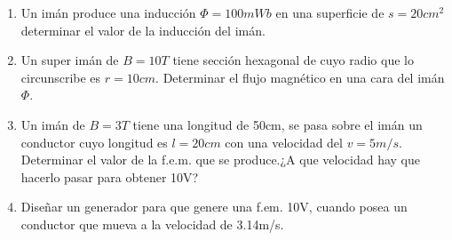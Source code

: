 \documentclass[../main]{subfiles}
\begin{document}
\begin{enumerate}
    \item Un imán produce una inducción $\Phi=100mWb$ en una superficie de $s=20cm^2$ determinar el valor de la inducción del imán.
    \item Un super imán de $B=10T$ tiene sección hexagonal de cuyo radio que lo circunscribe es $r=10cm$. Determinar el flujo magnético en una cara del imán $\Phi$.
    \item Un imán de $B=3T$ tiene una longitud de 50cm, se pasa sobre el imán un conductor cuyo longitud es $l=20cm$ con una velocidad del $v=5m/s$. Determinar el valor de la f.e.m. que se produce.¿A que velocidad hay que hacerlo pasar para obtener 10V?
    \item Diseñar un generador para que genere una f.em. 10V, cuando posea un conductor que mueva a la velocidad de 3.14m/s.
    
 \end{enumerate}
\end{document}
